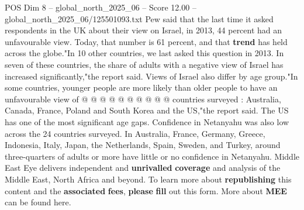 \begin{textsample}{POS Dim 8 – global\_north\_2025\_06 – Score 12.00 – global\_north\_2025\_06/125501093.txt}
Pew said that the last time it asked respondents in the UK about their view on Israel, in 2013, 44 percent had an unfavourable view.
Today, that number is 61 percent, and that \textbf{trend} has held across the globe."In 10 other countries, we last asked this question in 2013.
In seven of these countries, the share of adults with a negative view of Israel has increased significantly,"the report said.
Views of Israel also differ by age group."In some countries, younger people are more likely than older people to have an unfavourable view of @ @ @ @ @ @ @ @ @ @ countries surveyed : Australia, Canada, France, Poland and South Korea and the US,"the report said.
The US has one of the most significant age gaps.
Confidence in Netanyahu was also low across the 24 countries surveyed.
In Australia, France, Germany, Greece, Indonesia, Italy, Japan, the Netherlands, Spain, Sweden, and Turkey, around three-quarters of adults or more have little or no confidence in Netanyahu.
Middle East Eye delivers independent and \textbf{unrivalled} \textbf{coverage} and analysis of the Middle East, North Africa and beyond.
To learn more about \textbf{republishing} this content and the \textbf{associated} \textbf{fees}, \textbf{please} \textbf{fill} out this form.
More about \textbf{MEE} can be found here.

\end{textsample}
